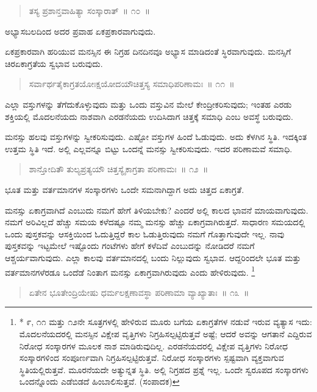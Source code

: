 \begin{verse}
ತಸ್ಯ ಪ್ರಶಾನ್ತವಾಹಿತ್ಯಾ ಸಂಸ್ಕಾರಾತ್​~॥ ೧೦~॥
\end{verse}

ಅಭ್ಯಾಸಬಲದಿಂದ ಅದರ ಪ್ರವಾಹ ಏಕಪ್ರಕಾರವಾಗುವುದು. 

ಏಕಪ್ರಕಾರವಾಗಿ ಹರಿಯುವ ಮನಸ್ಸಿನ ಈ ನಿಗ್ರಹ ದಿನದಿನವೂ ಅಭ್ಯಾಸ ಮಾಡಿದಂತೆ ಸ್ಥಿರವಾಗುವುದು. ಮನಸ್ಸಿಗೆ ಚಿರಏಕಾಗ್ರತೆಯ ಸ್ವಭಾವ ಬರುವುದು. 

\begin{verse}
ಸರ್ವಾರ್ಥತೈಕಾಗ್ರತಯೋಃಕ್ಷಯೋದಯೌಚಿತ್ತಸ್ಯ ಸಮಾಧಿಪರಿಣಾಮಃ~॥ ೧೧~॥
\end{verse}

ಎಲ್ಲಾ ವಸ್ತುಗಳನ್ನು ತೆಗೆದುಕೊಳ್ಳುವುದು ಮತ್ತು ಒಂದು ವಸ್ತುವಿನ ಮೇಲೆ ಕೇಂದ್ರೀಕರಿಸುವುದು; ಇಂತಹ ಎರಡು ಶಕ್ತಿಯಲ್ಲಿ ಮೊದಲನೆಯದು ನಾಶವಾಗಿ ಎರಡನೆಯದು ಉದಿಸಿದಾಗ ಚಿತ್ತಕ್ಕೆ ಸಮಾಧಿ ಎಂಬ ಅವಸ್ಥೆ ಬರುವುದು. 

ಮನಸ್ಸು ಹಲವು ವಸ್ತುಗಳನ್ನು ಸ್ವೀಕರಿಸುವುದು. ಎಷ್ಟೋ ವಸ್ತುಗಳ ಹಿಂದೆ ಓಡುವುದು. ಅದು ಕೆಳಗಿನ ಸ್ಥಿತಿ. ಇದಕ್ಕಿಂತ ಉತ್ತಮ ಸ್ಥಿತಿ ಇದೆ. ಅಲ್ಲಿ ಎಲ್ಲವನ್ನೂ ಬಿಟ್ಟು ಒಂದನ್ನೆ ಮನಸ್ಸು ಸ್ವೀಕರಿಸುವುದು. ಇದರ ಪರಿಣಾಮವೆ ಸಮಾಧಿ. 

\begin{verse}
ಶಾನ್ತೋದಿತೌ ತುಲ್ಯಪ್ರತ್ಯಯೌ ಚಿತ್ತಸ್ಯೈಕಾಗ್ರತಾ ಪರಿಣಾಮಃ~॥ ೧೨~॥
\end{verse}

ಭೂತ ಮತ್ತು ವರ್ತಮಾನಗಳ ಸಂಸ್ಕಾರಗಳು ಒಂದೇ ಸಮನಾಗಿದ್ದಾಗ ಅದು ಚಿತ್ತದ ಏಕಾಗ್ರತೆ. 

ಮನಸ್ಸು ಏಕಾಗ್ರವಾಗಿದೆ ಎಂಬುದು ನಮಗೆ ಹೇಗೆ ತಿಳಿಯಬೇಕು? ಎಂದರೆ ಅಲ್ಲಿ ಕಾಲದ ಭಾವನೆ ಮಾಯವಾಗುವುದು. ನಮಗೆ ಅರಿವಿಲ್ಲದೆ ಹೆಚ್ಚು ಸಮಯ ಕಳೆದಷ್ಟೂ ನಮ್ಮ ಮನಸ್ಸು ಹೆಚ್ಚು ಏಕಾಗ್ರವಾಗಿರುತ್ತದೆ. ಸಾಧಾರಣ ಸಮಯದಲ್ಲಿ ಒಂದು ಪುಸ್ತಕವನ್ನು ಆಸಕ್ತಿಯಿಂದ ಓದುತ್ತಿದ್ದರೆ ಕಾಲ ಓಡುತ್ತಿರುವುದು ನಮಗೆ ಗೊತ್ತಾಗುವುದೇ ಇಲ್ಲ. ನಾವು ಪುಸ್ತಕವನ್ನು ಇಟ್ಟಮೇಲೆ ಇಷ್ಟೊಂದು ಗಂಟೆಗಳು ಹೇಗೆ ಕಳೆದಿವೆ ಎಂಬುದನ್ನು ನೋಡಿದರೆ ನಮಗೆ ಆಶ್ಚರ್ಯವಾಗುವುದು. ಎಲ್ಲಾ ಕಾಲವು ವರ್ತಮಾನದಲ್ಲಿ ಬಂದು ನಿಲ್ಲುವುದು ಸ್ವಭಾವ. ಆದ್ದರಿಂದಲೇ ಭೂತ ಮತ್ತು ವರ್ತಮಾನಗಳೆರಡೂ ಒಂದೆಡೆ ನಿಂತಾಗ ಮನಸ್ಸು ಏಕಾಗ್ರವಾಗಿರುವುದು ಎಂದು ಹೇಳಿರುವುದು. \footnote{* ೯, ೧೧ ಮತ್ತು ೧೨ನೇ ಸೂತ್ರಗಳಲ್ಲಿ ಹೇಳಿರುವ ಮೂರು ಬಗೆಯ ಏಕಾಗ್ರತೆಗಳ ನಡುವೆ ಇರುವ ವ್ಯತ್ಯಾಸ ಇದು: ಮೊದಲನೆಯದರಲ್ಲಿ ಮನಸ್ಸಿನ ವಿಕ್ಷೇಪ ವೃತ್ತಿಗಳು ನಿಗ್ರಹಿಸಲ್ಪಟ್ಟಿರುತ್ತವೆ ಅಷ್ಟೆ; ಆದರೆ ಅವನ್ನು ಆಗತಾನೆ ಎದ್ದಿರುವ ನಿರೋಧ ಸಂಸ್ಕಾರಗಳ ಮೂಲಕ ನಾಶ ಮಾಡಿರುವುದಿಲ್ಲ. ಎರಡನೆಯದರಲ್ಲಿ ವಿಕ್ಷೇಪ ವೃತ್ತಿಗಳು ನಿರೋಧ ಸಂಸ್ಕಾರಗಳಿಂದ ಸಂಪೂರ್ಣವಾಗಿ ನಿಗ್ರಹಿಸಲ್ಪಟ್ಟಿರುತ್ತವೆ. ನಿರೋಧ ಸಂಸ್ಕಾರಗಳು ಸ್ಪಷ್ಟವಾಗಿ ವ್ಯಕ್ತವಾಗುವ ಸ್ಥಿತಿಯಲ್ಲಿರುತ್ತವೆ. ಮೂರನೆಯದೇ ಅತ್ಯುನ್ನತ ಸ್ಥಿತಿ. ಅಲ್ಲಿ ನಿಗ್ರಹದ ಪ್ರಶ್ನೆ ಇಲ್ಲ. ಒಂದೇ ಸ್ವರೂಪದ ಸಂಸ್ಕಾರಗಳು ಒಂದನ್ನೊಂದು ಎಡೆಬಿಡದೆ ಹಿಂಬಾಲಿಸುತ್ತವೆ. (ಸಂಪಾದಕ)}


\begin{verse}
ಏತೇನ ಭೂತೇಂದ್ರಿಯೇಷು ಧರ್ಮಲಕ್ಷಣಾವಸ್ಥಾ ಪರಿಣಾಮಾ ವ್ಯಾಖ್ಯಾತಾಃ~॥ ೧೩~॥
\end{verse}

